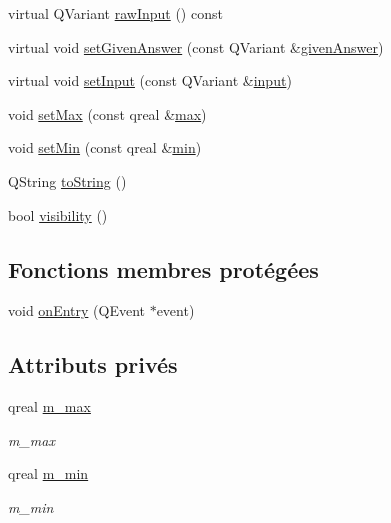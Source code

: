 \begin{DoxyCompactItemize}
virtual Q\-Variant \hyperlink{classSimpleHotel_1_1SH__InOutState_a5e8064672e20c7b13fec67a4955a3ce3}{raw\-Input} () const 
\item 
virtual void \hyperlink{classSimpleHotel_1_1SH__QuestionState_aeb4464741ecd13b283c504def63dd619}{set\-Given\-Answer} (const Q\-Variant \&\hyperlink{classSimpleHotel_1_1SH__QuestionState_a243f09bc1f822af7748edb038ac2957c}{given\-Answer})
\item 
virtual void \hyperlink{classSimpleHotel_1_1SH__QuestionState_ae404d8874e542fd5f3e6d658f003bae4}{set\-Input} (const Q\-Variant \&\hyperlink{classSimpleHotel_1_1SH__InOutState_a487d2ca6200fed372b1a27cfa27774db}{input})
\item 
void \hyperlink{classSimpleHotel_1_1SH__DecimalQuestionState_af1ba1d4492697d7956862e2842bb5b43}{set\-Max} (const qreal \&\hyperlink{classSimpleHotel_1_1SH__DecimalQuestionState_af97491a4d3adbc9bee96c4cc8aefeb99}{max})
\item 
void \hyperlink{classSimpleHotel_1_1SH__DecimalQuestionState_adb78c98d2b895cf8a89224c84aab3d0b}{set\-Min} (const qreal \&\hyperlink{classSimpleHotel_1_1SH__DecimalQuestionState_a16a881ee4e99b6a02a07cff533c9c82c}{min})
\item 
Q\-String \hyperlink{classSimpleHotel_1_1SH__GenericState_adaded78178f9999a9e07a32871af5e61}{to\-String} ()
\item 
bool \hyperlink{classSimpleHotel_1_1SH__InOutState_a145a6e0e2c9e22971e35aa4538adeb4a}{visibility} ()
\end{DoxyCompactItemize}
\subsection*{Fonctions membres protégées}
\begin{DoxyCompactItemize}
\item 
void \hyperlink{classSimpleHotel_1_1SH__GenericState_adebdb330ff20556a54a833b15e50eacc}{on\-Entry} (Q\-Event $\ast$event)
\end{DoxyCompactItemize}
\subsection*{Attributs privés}
\begin{DoxyCompactItemize}
\item 
qreal \hyperlink{classSimpleHotel_1_1SH__DecimalQuestionState_a8bc449bf4ea6dd8d2e9b335a486b72bb}{m\-\_\-max}
\begin{DoxyCompactList}\small\item\em m\-\_\-max \end{DoxyCompactList}\item 
qreal \hyperlink{classSimpleHotel_1_1SH__DecimalQuestionState_a412de5c017845e82252a280ac918e11b}{m\-\_\-min}
\begin{DoxyCompactList}\small\item\em m\-\_\-min \end{DoxyCompactList}\end{DoxyCompactItemize}


